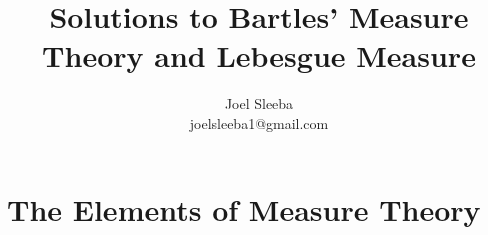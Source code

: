\documentclass[12pt]{report}
\theoremstyle{plain} %
\theoremstyle{definition} %
\theoremstyle{remark} %
\newif\ifshowsolutions
\begin{document}
\title{Solutions to Bartles' Measure Theory and Lebesgue Measure}

\author{
	Joel Sleeba \\
	joelsleeba1@gmail.com \\
}

\maketitle

 \setcounter{page}{2}
\tableofcontents
{} \setcounter{page}{1}

\showsolutionstrue
\part{The Elements of Measure Theory}
\setcounter{chapter}{1}





\printbibliography[heading=bibintoc]
\end{document}

